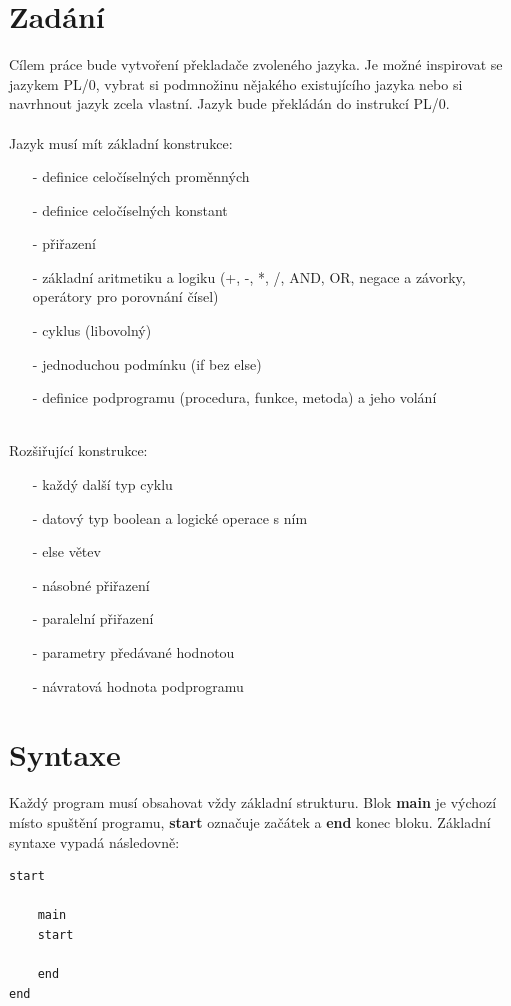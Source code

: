 \documentclass[12pt]{report}
\begin{document}
\chapter{Zadání}
Cílem práce bude vytvoření překladače zvoleného jazyka. Je možné inspirovat se jazykem PL/0, vybrat si podmnožinu nějakého existujícího jazyka nebo si navrhnout jazyk zcela vlastní. Jazyk bude překládán do instrukcí PL/0. 
\\
\\
Jazyk musí mít základní konstrukce:
\begin{itemize}[noitemsep]
	\item [-] definice celočíselných proměnných
	\item [-] definice celočíselných konstant
	\item [-] přiřazení
	\item [-] základní aritmetiku a logiku (+, -, *, /, AND, OR, negace a závorky, operátory pro porovnání čísel)
	\item [-] cyklus (libovolný)
	\item [-] jednoduchou podmínku (if bez else)
	\item [-] definice podprogramu (procedura, funkce, metoda) a jeho volání
\end{itemize}
\ \\
Rozšiřující konstrukce:
\begin{itemize}[noitemsep]
	\item [-] každý další typ cyklu
	\item [-] datový typ boolean a logické operace s ním
	\item [-] else větev
	\item [-] násobné přiřazení
	\item [-] paralelní přiřazení
	\item [-] parametry předávané hodnotou
	\item [-] návratová hodnota podprogramu
\end{itemize}

\chapter{Syntaxe}

Každý program musí obsahovat vždy základní strukturu. Blok \textbf{main} je výchozí místo spuštění programu, \textbf{start} označuje začátek a \textbf{end} konec bloku. Základní syntaxe vypadá následovně: 
\begin{verbatim}
start

    main
    start
    
    end
end
\end{verbatim}
\end{document}
